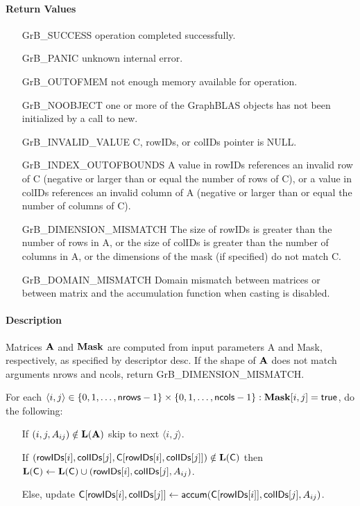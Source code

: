 \paragraph{Return Values}

\begin{itemize}[leftmargin=2.1in]
\item[{\sf GrB\_SUCCESS}]      operation completed successfully.
\item[{\sf GrB\_PANIC}]        unknown internal error.
\item[{\sf GrB\_OUTOFMEM}]     not enough memory available for operation.
\item[{\sf GrB\_NOOBJECT}]          one or more of the GraphBLAS objects has
                                    not been initialized by a call to {\sf new}.
\item[{\sf GrB\_INVALID\_VALUE}]    {\sf C}, {\sf rowIDs}, or {\sf colIDs} pointer is {\sf NULL}.
\item[{\sf GrB\_INDEX\_OUTOFBOUNDS}]
        A value in {\sf rowIDs} references an invalid row of {\sf C} (negative or larger than or equal the number of rows of {\sf C}),
        or a value in {\sf colIDs} references an invalid column of {\sf A} (negative or larger than or equal the number of columns of {\sf C}).
\item[{\sf GrB\_DIMENSION\_MISMATCH}] 
        The size of {\sf rowIDs} is greater than the number of rows in {\sf A}, or
        the size of {\sf colIDs} is greater than the number of columns in {\sf A}, or
        the dimensions of the mask (if specified) do not match {\sf C}.
\item[\sf GrB\_DOMAIN\_MISMATCH]  
       Domain mismatch between matrices or between matrix and the accumulation function when casting is disabled.
\end{itemize}

\paragraph{Description}

Matrices ${\bf A}$ and ${\bf Mask}$ are computed from input parameters {\sf A} and {\sf Mask}, respectively,
as specified by descriptor {\sf desc}. If the shape of ${\bf A}$ does not match arguments {\sf nrows} and {\sf ncols},
return {\sf GrB\_DIMENSION\_MISMATCH}.

For each $\langle i,j \rangle \in \{0, 1, \ldots, {\sf nrows}-1 \} \times \{0, 1, \ldots, {\sf ncols}-1 \} : {\bf Mask}[i,j] = {\sf true}$, do the following:
\begin{itemize}
	\item[] If $(i,j,A_{ij}) \notin \bold{L}({\bf A})$ skip to next $\langle i,j \rangle$.
	\item[] If $({\sf rowIDs}[i], {\sf colIDs}[j], {\sf C}[{\sf rowIDs}[i],{\sf colIDs}[j]]) \notin \bold{L}({\sf C})$ then
	      $\bold{L}({\sf C}) \leftarrow \bold{L}({\sf C}) \cup ({\sf rowIDs}[i],{\sf colIDs}[j],A_{ij})$.
	\item[]  Else, update ${\sf C}[{\sf rowIDs}[i],{\sf colIDs}[j]] \leftarrow {\sf accum}({\sf C}[{\sf rowIDs}[i]],{\sf colIDs}[j],A_{ij})$.
\end{itemize}

